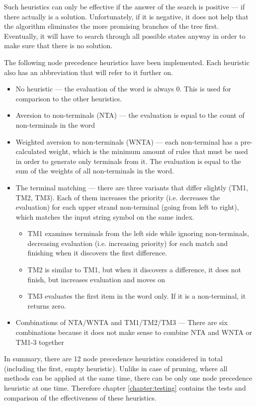 \begin{enumerate}
Such heuristics can only be effective if the answer of the search is positive --- if there actually is a solution. Unfortunately, if it is negative, it does not help that the algorithm eliminates the more promising branches of the tree first. Eventually, it will have to search through all possible states anyway in order to make sure that there is no solution.

The following node precedence heuristics have been implemented. Each heuristic also has an abbreviation that will refer to it further on.

\begin{itemize}
  \item{No heuristic --- the evaluation of the word is always 0. This is used for comparison to the other heuristics.}
  \item{Aversion to non-terminals (NTA) --- the evaluation is equal to the count of non-terminals in the word}
  \item{Weighted aversion to non-terminals (WNTA) --- each non-terminal has a pre-calculated weight, which is the minimum amount of rules that must be used in order to generate only terminals from it. The evaluation is equal to the sum of the weights of all non-terminals in the word.}
  \item{The terminal matching --- there are three variants that differ slightly (TM1, TM2, TM3). Each of them increases the priority (i.e. decreases the evaluation) for each upper strand non-terminal (going from left to right), which matches the input string symbol on the same index.
  \begin{itemize}
    \item{TM1 examines terminals from the left side while ignoring non-terminals, decreasing evaluation (i.e. increasing priority) for each match and finishing when it discovers the first difference.}
    \item{TM2 is similar to TM1, but when it discovers a difference, it does not finish, but increases evaluation and moves on}
    \item{TM3 evaluates the first item in the word only. If it is a non-terminal, it returns zero.}
  \end{itemize}
  }
  \item{Combinations of NTA/WNTA and TM1/TM2/TM3 --- There are six combinations because it does not make sense to combine NTA and WNTA or TM1-3 together}
\end{itemize}

In summary, there are 12 node precedence heuristics considered in total (including the first, empty heuristic). Unlike in case of pruning, where all methods can be applied at the same time, there can be only one node precedence heuristic at one time. Therefore chapter \ref{chapter:testing} contains the tests and comparison of the effectiveness of these heuristics.
\end{enumerate}

